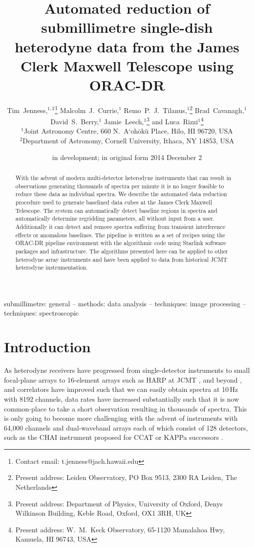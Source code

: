 \documentclass[useAMS,usenatbib]{mn2e}
\title[JCMT Heterodyne Data Reduction Pipeline]{Automated reduction of submillimetre single-dish heterodyne
  data from the James Clerk Maxwell Telescope using ORAC-DR}
\author[T. Jenness et al.]
{Tim~Jenness,$^{1,2}$\thanks{Contact email: t.jenness@jach.hawaii.edu}
Malcolm~J.~Currie,$^1$
Remo~P.~J.~Tilanus,$^1$\thanks{Present address: Leiden Observatory, PO Box 9513, 2300 RA Leiden, The Netherlands}
Brad~Cavanagh,$^1$
\newauthor
David~S.~Berry,$^1$
Jamie~Leech,$^1$\thanks{Present address: Department of Physics, University of
  Oxford, Denys Wilkinson Building, Keble Road, Oxford, OX1 3RH, UK}
and
Luca~Rizzi$^1$\thanks{Present address: W.\ M.\ Keck Observatory, 65-1120 Mamalahoa Hwy, Kamuela, HI 96743, USA}\\
$^1$Joint Astronomy Centre, 660 N.\ A`oh\=ok\=u Place, Hilo, HI 96720, USA \\
$^2$Department of Astronomy, Cornell University, Ithaca, NY 14853, USA
}
\begin{document}
\date{in development; in original form 2014 December 2}

\pagerange{\pageref{firstpage}--\pageref{lastpage}} 

\maketitle

\label{firstpage}

\begin{abstract}

  With the advent of modern multi-detector heterodyne instruments that
  can result in observations generating thousands of spectra per
  minute it is no longer feasible to reduce these data as individual
  spectra. We describe the automated data reduction procedure used to
  generate baselined data cubes at the James Clerk Maxwell
  Telescope. The system can automatically detect baseline regions in
  spectra and automatically determine regridding parameters, all
  without input from a user. Additionally it can detect and remove
  spectra suffering from transient interference effects or anomalous
  baselines. The pipeline is written as a set of recipes using the
  ORAC-DR pipeline environment with the algorithmic code using
  Starlink software packages and infrastructure.  The algorithms
  presented here can be applied to other heterodyne array instruments
  and have been applied to data from historical JCMT heterodyne
  instrumentation.

\end{abstract}

\begin{keywords}
submillimetre: general --
methods: data analysis --
techniques: image processing --
techniques: spectroscopic

\end{keywords}

\section{Introduction}
\label{sec:intro}

As heterodyne receivers have progressed from single-detector
instruments
\citep{1992IJIMW..13.1487P,1992IJIMW..13..647D,1992IJIMW..13.1827C} to
small focal-plane arrays
\citep{2003SPIE.4855..322G,2004A&A...423.1171S} to 16-element arrays
such as HARP at JCMT \citep{2009MNRAS.399.1026B}, and beyond
\citep{2012SPIE.8452E..04K,2014SPIE.9153E..27H}, and correlators have improved such that
we can easily obtain spectra at 10\,Hz with 8192 channels, data rates
have increased substantially such that it is now common-place to take
a short observation resulting in thousands of spectra. This is only
going to become more challenging with the advent of instruments with
64,000 channels and dual-waveband arrays each of which consist of 128
detectors, such as the CHAI instrument proposed for CCAT
\citep{2014SPIE9152-109}
or KAPPa successors \citep{2014SPIE.9153E..0KW}.
\end{document}

